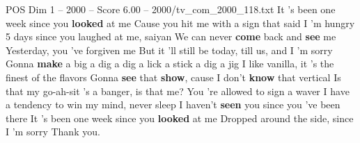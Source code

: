 \begin{textsample}{POS Dim 1 – 2000 – Score 6.00 – 2000/tv\_com\_2000\_118.txt}  \label{ex:f1_pos_073}
It 's been one week since you \textbf{looked} at me Cause you hit me with a sign that said I 'm hungry 5 days since you laughed at me, saiyan We can never \textbf{come} back and \textbf{see} me Yesterday, you 've forgiven me But it 'll still be today, till us, and I 'm sorry Gonna \textbf{make} a big a dig a dig a lick a stick a dig a jig I like vanilla, it 's the finest of the flavors Gonna \textbf{see} that \textbf{show}, cause I don't \textbf{know} that vertical Is that my go-ah-sit 's a banger, is that me?
You 're allowed to sign a waver I have a tendency to win my mind, never sleep I haven't \textbf{seen} you since you 've been there It 's been one week since you \textbf{looked} at me Dropped around the side, since I 'm sorry Thank you.

\end{textsample}
